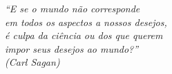 
\vspace*{\fill}
  \begin{flushright}
    \textit{``E se o mundo não corresponde\\
	      em todos os aspectos a nossos desejos,\\
	      é culpa da ciência ou dos que querem\\
	      impor seus desejos ao mundo?''\\
            (Carl Sagan)
	  }
  \end{flushright}
